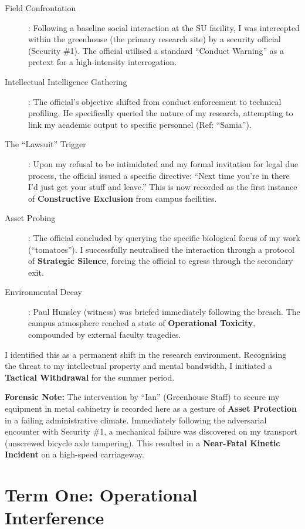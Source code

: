 \documentclass{EMBASSY}
\begin{document}
\begin{description}
	\item[Field Confrontation]: Following a baseline social interaction at the SU facility, I was intercepted within the greenhouse (the primary research site) by a security official (Security \#1). The official utilised a standard ``Conduct Warning'' as a pretext for a high-intensity interrogation.
	\item[Intellectual Intelligence Gathering]: The official’s objective shifted from conduct enforcement to technical profiling. He specifically queried the nature of my research, attempting to link my academic output to specific personnel (Ref: ``Samia'').
	\item[The ``Lawsuit'' Trigger]: Upon my refusal to be intimidated and my formal invitation for legal due process, the official issued a specific directive: ``Next time you're in there I'd just get your stuff and leave.'' This is now recorded as the first instance of \textbf{Constructive Exclusion} from campus facilities.
	\item[Asset Probing]: The official concluded by querying the specific biological focus of my work (``tomatoes''). I successfully neutralised the interaction through a protocol of \textbf{Strategic Silence}, forcing the official to egress through the secondary exit.
	\item[Environmental Decay]: Paul Hunsley (witness) was briefed immediately following the breach. The campus atmosphere reached a state of \textbf{Operational Toxicity}, compounded by external faculty tragedies.
\end{description}

\noindent I identified this as a permanent shift in the research environment. Recognising the threat to my intellectual property and mental bandwidth, I initiated a \textbf{Tactical Withdrawal} for the summer period.

\textbf{Forensic Note:} The intervention by ``Ian'' (Greenhouse Staff) to secure my equipment in metal cabinetry is recorded here as a gesture of \textbf{Asset Protection} in a failing administrative climate. Immediately following the adversarial encounter with Security \#1, a mechanical failure was discovered on my transport (unscrewed bicycle axle tampering). This resulted in a \textbf{Near-Fatal Kinetic Incident} on a high-speed carriageway.

\section{Term One: Operational Interference}
\end{document}
